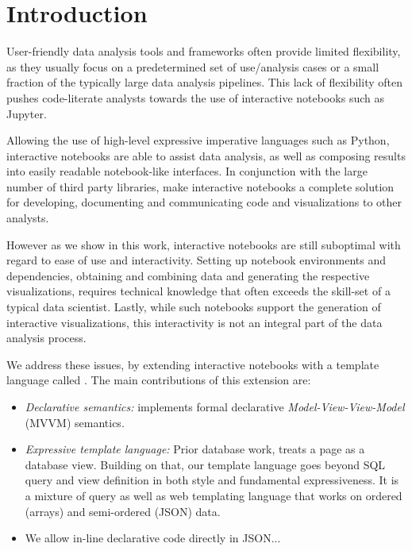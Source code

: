\section{Introduction}
\label{section:introduction}

User-friendly data analysis tools and frameworks often provide limited flexibility, as they usually focus on a predetermined set of use/analysis cases or a small fraction of the typically large data analysis pipelines. This lack of flexibility often pushes code-literate analysts towards the use of interactive notebooks such as Jupyter.

Allowing the use of high-level expressive imperative languages such as Python, interactive notebooks are able to assist data analysis, as well as composing results into easily readable notebook-like interfaces. In conjunction with the large number of third party libraries, make interactive notebooks a complete solution for developing, documenting and communicating code and visualizations to other analysts. 

However as we show in this work, interactive notebooks are still suboptimal with regard to ease of use and interactivity. Setting up notebook environments and dependencies, obtaining and combining data and generating the respective visualizations, requires technical knowledge that often exceeds the skill-set of a typical data scientist. Lastly, while such notebooks support the generation of interactive visualizations, this interactivity is not an integral part of the data analysis process. 

We address these issues, by extending interactive notebooks with a template language called {\projname}. The main contributions of this extension are:

\begin{itemize}
	\item \textit{Declarative semantics:} {\projname} implements formal declarative \textit{Model-View-View-Model} (MVVM) semantics. 
	\item \textit{Expressive template language:} Prior database work, treats a page as a database view. Building on that, our template language goes beyond SQL query and view definition in both style and fundamental expressiveness. It is a mixture of query as well as web templating language that works on ordered (arrays) and semi-ordered (JSON) data. 
	\item We allow in-line declarative code directly in JSON...
\end{itemize}

